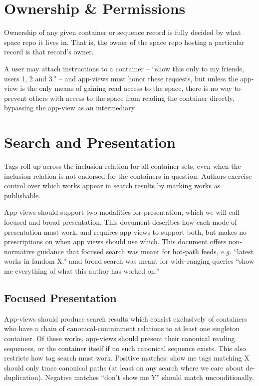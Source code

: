 \documentclass{amsart}
\theoremstyle{remark}
\begin{document}
\section{Ownership \& Permissions} Ownership of any given container or sequence record is fully decided by what space repo it lives in. That is, the owner of the space repo hosting a particular record is that record's owner. 

A user may attach instructions to a container -- ``show this only to my friends, users 1, 2 and 3.'' -- and app-views must honor these requests, but unless the app-view is the only means of gaining read access to the space, there is no way to prevent others with access to the space from reading the container directly, bypassing the app-view as an intermediary.

\section{Search and Presentation}
Tags roll up across the inclusion relation for all container sets, even when the inclusion relation is not endorsed for the containers in question. Authors exercise control over which works appear in search results by marking works as publishable.

App-views should support two modalities for presentation, which we will call focused and broad presentation. This document describes how each mode of presentation must work, and requires app views to support both, but makes no prescriptions on when app views should use which. This document offers non-normative guidance that focused search was meant for hot-path feeds, \emph{e.g.} ``latest works in fandom X.'' amd broad search was meant for wide-ranging queries ``show me everything of what this author has worked on.''

\subsection{Focused Presentation}
App-views should produce search results which consist exclusively of containers who have a chain of canonical-containment relations to at least one singleton container. Of these works, app-views should present their canonical reading sequences, or the container itself if no such canonical sequence exists. This also restricts how tag search must work. Positive matches: show me tags matching X should only trace canonical paths (at least on any search where we care about de-duplication). Negative matches ``don't show me Y'' should match unconditionally. 
\end{document}
